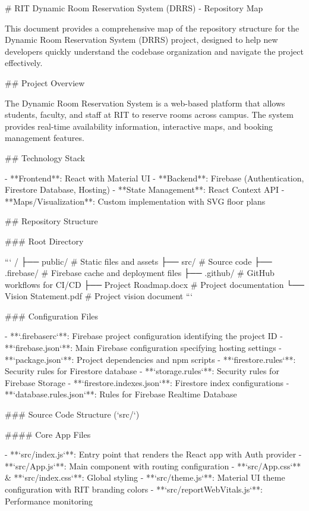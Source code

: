 # RIT Dynamic Room Reservation System (DRRS) - Repository Map

This document provides a comprehensive map of the repository structure for the Dynamic Room Reservation System (DRRS) project, designed to help new developers quickly understand the codebase organization and navigate the project effectively.

## Project Overview

The Dynamic Room Reservation System is a web-based platform that allows students, faculty, and staff at RIT to reserve rooms across campus. The system provides real-time availability information, interactive maps, and booking management features.

## Technology Stack

- **Frontend**: React with Material UI
- **Backend**: Firebase (Authentication, Firestore Database, Hosting)
- **State Management**: React Context API
- **Maps/Visualization**: Custom implementation with SVG floor plans

## Repository Structure

### Root Directory

```
/
├── public/                   # Static files and assets
├── src/                      # Source code 
├── .firebase/                # Firebase cache and deployment files
├── .github/                  # GitHub workflows for CI/CD
├── Project Roadmap.docx      # Project documentation
└── Vision Statement.pdf      # Project vision document
```

### Configuration Files

- **`.firebaserc`**: Firebase project configuration identifying the project ID
- **`firebase.json`**: Main Firebase configuration specifying hosting settings
- **`package.json`**: Project dependencies and npm scripts
- **`firestore.rules`**: Security rules for Firestore database
- **`storage.rules`**: Security rules for Firebase Storage
- **`firestore.indexes.json`**: Firestore index configurations
- **`database.rules.json`**: Rules for Firebase Realtime Database

### Source Code Structure (`src/`)

#### Core App Files

- **`src/index.js`**: Entry point that renders the React app with Auth provider
- **`src/App.js`**: Main component with routing configuration
- **`src/App.css`** & **`src/index.css`**: Global styling
- **`src/theme.js`**: Material UI theme configuration with RIT branding colors
- **`src/reportWebVitals.js`**: Performance monitoring

